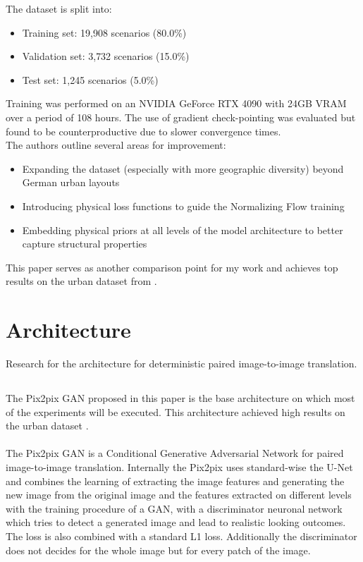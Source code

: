 			The dataset is split into:
			\begin{itemize}[itemsep=1mm, parsep=0pt]
				\item Training set: 19{,}908 scenarios (80.0\%)
				\item Validation set: 3{,}732 scenarios (15.0\%)
				\item Test set: 1{,}245 scenarios (5.0\%)
			\end{itemize}
			Training was performed on an NVIDIA GeForce RTX 4090 with 24GB VRAM over a period of 108 hours. The use of gradient check-pointing was evaluated but found to be counterproductive due to slower convergence times.\\
			The authors outline several areas for improvement:
			\begin{itemize}[itemsep=1mm, parsep=0pt]
				\item Expanding the dataset (especially with more geographic diversity) beyond German urban layouts
				\item Introducing physical loss functions to guide the Normalizing Flow training
				\item Embedding physical priors at all levels of the model architecture to better capture structural properties
			\end{itemize}
			This paper serves as another comparison point for my work and achieves top results on the urban dataset from \cite{spitznagel_urban_2024-1}.
		
	
	
	\newpage
	\section{Architecture}
	\label{sec:lit-architecture}
		Research for the architecture for deterministic paired image-to-image translation.
		
		\subsection{}
			The Pix2pix GAN proposed in this paper is the base architecture on which most of the experiments will be executed. This architecture achieved high results on the urban dataset \cite{spitznagel_urban_2024-1}.\\
			\\
			The Pix2pix GAN is a Conditional Generative Adversarial Network for paired image-to-image translation. Internally the Pix2pix uses standard-wise the U-Net \cite{ronneberger_u-net_2015} and combines the learning of extracting the image features and generating the new image from the original image and the features extracted on different levels with the training procedure of a GAN, with a discriminator neuronal network which tries to detect a generated image and lead to realistic looking outcomes. The loss is also combined with a standard L1 loss. Additionally the discriminator does not decides for the whole image but for every patch of the image.
			
